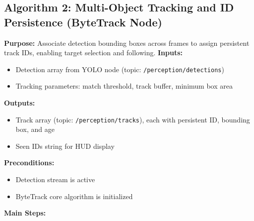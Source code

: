 \documentclass[12pt,a4paper]{report}
\begin{document}
\subsection{Algorithm 2: Multi-Object Tracking and ID Persistence (ByteTrack Node)}
\textbf{Purpose:} Associate detection bounding boxes across frames to assign persistent track IDs, enabling target selection and following.
\textbf{Inputs:}
\begin{itemize}
    \item Detection array from YOLO node (topic: \texttt{/perception/detections})
    \item Tracking parameters: match threshold, track buffer, minimum box area
\end{itemize}
\textbf{Outputs:}
\begin{itemize}
    \item Track array (topic: \texttt{/perception/tracks}), each with persistent ID, bounding box, and age
    \item Seen IDs string for HUD display
\end{itemize}
\textbf{Preconditions:}
\begin{itemize}
    \item Detection stream is active
    \item ByteTrack core algorithm is initialized
\end{itemize}
\textbf{Main Steps:}
\end{document}
